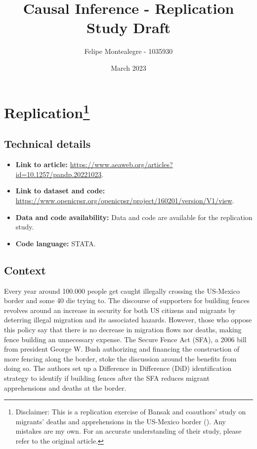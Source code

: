 \documentclass[titlepage]{article}
\begin{document}
\title{Causal Inference - Replication Study Draft}


\author[1]{Felipe Montealegre - 1035930}


\date{March 2023}

\maketitle

\section*{Replication\footnote{Disclaimer: This is a replication exercise of Bansak and coauthors’ study on migrants' deaths and apprehensions in the US-Mexico border (\cite{Bansak2022}). Any mistakes are my own. For an accurate understanding of their study, please refer to the original article.}}

\subsection*{Technical details}

\begin{itemize}
    \item \textbf{Link to article:} \href{https://www.aeaweb.org/articles?id=10.1257/pandp.20221023}{https://www.aeaweb.org/articles?id=10.1257/pandp.20221023}.
    \item \textbf{Link to dataset and code:} \href{https://www.openicpsr.org/openicpsr/project/160201/version/V1/view}{https://www.openicpsr.org/openicpsr/project/160201/version/V1/view}.
    \item \textbf{Data and code availability:} Data and code are available for the replication study.
    \item \textbf{Code language:} STATA.
\end{itemize}

\subsection*{Context}

Every year around 100.000 people get caught illegally crossing the US-Mexico border and some 40 die trying to. The discourse of supporters for building fences revolves around an increase in security for both US citizens and migrants by deterring illegal migration and its associated hazards. However, those who oppose this policy say that there is no decrease in migration flows nor deaths, making fence building an unnecessary expense. The Secure Fence Act (SFA), a 2006 bill from president George W. Bush authorizing and financing the construction of more fencing along the border, stoke the discussion around the benefits from doing so. The authors set up a Difference in Difference (DiD) identification strategy to identify if building fences after the SFA reduces migrant apprehensions and deaths at the border.
\end{document}
